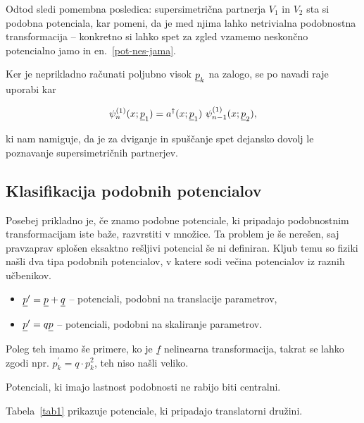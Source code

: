\ni Odtod sledi pomembna posledica: supersimetri\v cna partnerja $V_1$ in $V_2$ sta si podobna potenciala, kar
pomeni, da je med njima lahko netrivialna podobnostna transformacija -- konkretno si lahko spet za zgled vzamemo
neskon\v cno potencialno jamo in en.~\eqref{pot-nes-jama}.

Ker je neprikladno ra\v cunati poljubno visok $\underline{p}_k$ na zalogo, se po navadi raje uporabi kar

\begin{equation}
	\psi^{(1)}_n (x; \underline{p}_1) = a^\dagger (x; \underline{p}_1)\ \psi_{n-1}^{(1)} (x; \underline{p}_2),
\end{equation}

\ni ki nam namiguje, da je za dviganje in spu\v s\v canje spet dejansko dovolj le poznavanje supersimetri\v cnih
partnerjev.

\subsection{Klasifikacija podobnih potencialov}

Posebej prikladno je, \v ce znamo podobne potenciale, ki pripadajo podobnostnim transformacijam iste ba\v ze,
razvrstiti v mno\v zice. Ta problem je \v se nere\v sen, saj pravzaprav splo\v sen eksaktno re\v sljivi potencial
\v se ni definiran. Kljub temu so fiziki na\v sli dva tipa podobnih potencialov, v katere sodi ve\v cina
potencialov iz raznih u\v cbenikov.

\begin{itemize}
	\item{$\underline{p}^\prime = \underline{p} + \underline{q}$ -- potenciali, podobni na translacije parametrov,}
	\item{$\underline{p}^\prime = q\underline{p}$ -- potenciali, podobni na skaliranje parametrov.}
\end{itemize}

Poleg teh imamo \v se primere, ko je $\underline{f}$ nelinearna transformacija, takrat se lahko
zgodi npr. $p^\prime_k = q \cdot p_k^2$, teh niso na\v sli veliko.

Potenciali, ki imajo lastnost podobnosti ne rabijo biti centralni.

\ni Tabela~\ref{tab1} prikazuje potenciale, ki pripadajo translatorni dru\v zini.

